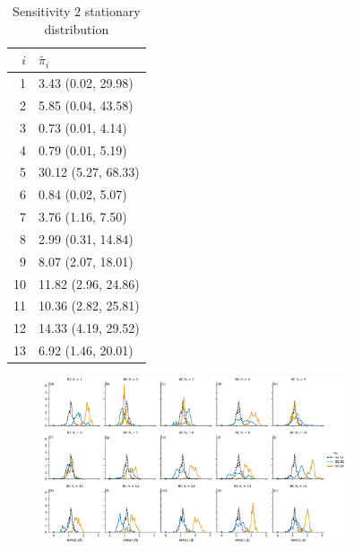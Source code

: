 \begin{table}
 \centering
 \caption{Sensitivity 2 stationary distribution}
 \label{tab:my_label}
 \begin{tabular}{rl}
 \toprule
 $i$ & $\tilde{\pi_{i}}$ \\
 \midrule
 1 & 3.43 (0.02, 29.98) \\
 2 & 5.85 (0.04, 43.58) \\
 3 & 0.73 (0.01, 4.14) \\
 4 & 0.79 (0.01, 5.19) \\
 5 & 30.12 (5.27, 68.33) \\
 6 & 0.84 (0.02, 5.07) \\
 7 & 3.76 (1.16, 7.50) \\
 8 & 2.99 (0.31, 14.84) \\
 9 & 8.07 (2.07, 18.01) \\
 10 & 11.82 (2.96, 24.86) \\
 11 & 10.36 (2.82, 25.81) \\
 12 & 14.33 (4.19, 29.52) \\
 13 & 6.92 (1.46, 20.01) \\
 \bottomrule
 \end{tabular}
\end{table}

\begin{figure}
 \centering
 \label{fig:sens_2_overlap}
 \includegraphics[width=0.8\textwidth]{chapters/aadh/figures/sensitivity_2_5_overlap.png}

\end{figure}





